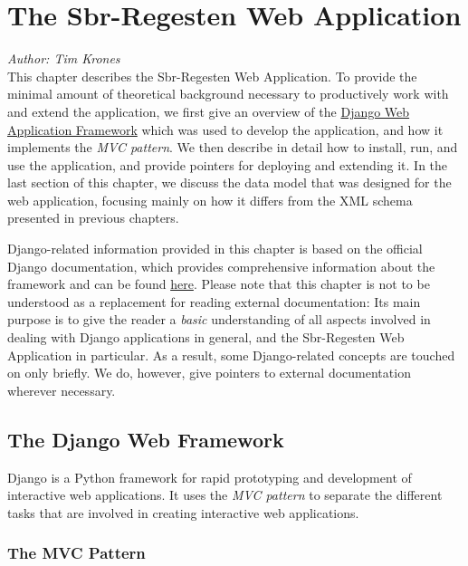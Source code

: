 \section{The Sbr-Regesten Web Application}
\label{sec:webapp}

\emph{Author: Tim Krones} \\

This chapter describes the Sbr-Regesten Web Application. To provide
the minimal amount of theoretical background necessary to productively
work with and extend the application, we first give an overview of the
\href{https://www.djangoproject.com/}{Django Web Application
  Framework} which was used to develop the application, and how it
implements the \emph{MVC pattern}. We then describe in detail how to
install, run, and use the application, and provide pointers for
deploying and extending it. In the last section of this chapter, we
discuss the data model that was designed for the web application,
focusing mainly on how it differs from the XML schema presented in
previous chapters.

Django-related information provided in this chapter is based on the
official Django documentation, which provides comprehensive
information about the framework and can be found
\href{https://docs.djangoproject.com/}{here}. Please note that this
chapter is not to be understood as a replacement for reading external
documentation: Its main purpose is to give the reader a \emph{basic}
understanding of all aspects involved in dealing with Django
applications in general, and the Sbr-Regesten Web Application in
particular. As a result, some Django-related concepts are touched on
only briefly. We do, however, give pointers to external documentation
wherever necessary.

\subsection{The Django Web Framework}
\label{sec:django}

Django is a Python framework for rapid prototyping and development of
interactive web applications. It uses the \emph{MVC pattern} to
separate the different tasks that are involved in creating interactive
web applications.

\subsubsection{The MVC Pattern}
\label{sec:mvc}

